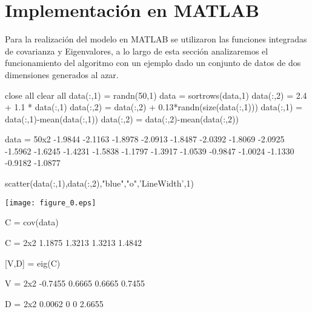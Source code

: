 \documentclass{article}
\begin{document}
\section{Implementación en MATLAB}
Para la realización del modelo en MATLAB se utilizaron las funciones integradas de covarianza y Eigenvalores, a lo largo de esta sección analizaremos el funcionamiento del algoritmo con un ejemplo dado un conjunto de datos de dos dimensiones generados al azar.
\begin{matlabcode}
close all
clear all
data(:,1) = randn(50,1)
data = sortrows(data,1)
data(:,2) = 2.4 + 1.1 * data(:,1)
data(:,2) = data(:,2) + 0.13*randn(size(data(:,1)))
data(:,1) = data(:,1)-mean(data(:,1))
data(:,2) = data(:,2)-mean(data(:,2))
\end{matlabcode}
\begin{matlaboutput}
data = 50x2    
   -1.9844   -2.1163
   -1.8978   -2.0913
   -1.8487   -2.0392
   -1.8069   -2.0925
   -1.5962   -1.6245
   -1.4231   -1.5838
   -1.1797   -1.3917
   -1.0539   -0.9847
   -1.0024   -1.1330
   -0.9182   -1.0877

\end{matlaboutput}
\begin{matlabcode}
scatter(data(:,1),data(:,2),"blue","o",'LineWidth',1)
\end{matlabcode}
\begin{center}
\texttt{[image: figure\_0.eps]}
\end{center}
\begin{matlabcode}
C = cov(data)
\end{matlabcode}
\begin{matlaboutput}
C = 2x2    
    1.1875    1.3213
    1.3213    1.4842

\end{matlaboutput}
\begin{matlabcode}
[V,D] = eig(C) 
\end{matlabcode}
\begin{matlaboutput}
V = 2x2    
   -0.7455    0.6665
    0.6665    0.7455

D = 2x2    
    0.0062         0
         0    2.6655

\end{matlaboutput}
\end{document}
